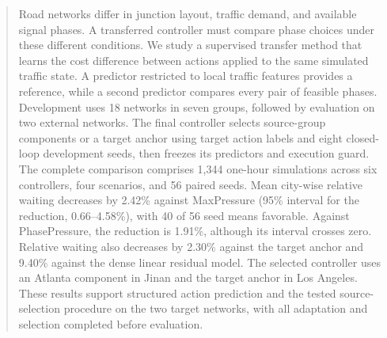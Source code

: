 \begin{abstract}
Road networks differ in junction layout, traffic demand, and available signal phases. A transferred controller must compare phase choices under these different conditions. We study a supervised transfer method that learns the cost difference between actions applied to the same simulated traffic state. A predictor restricted to local traffic features provides a reference, while a second predictor compares every pair of feasible phases. Development uses 18 networks in seven groups, followed by evaluation on two external networks. The final controller selects source-group components or a target anchor using target action labels and eight closed-loop development seeds, then freezes its predictors and execution guard. The complete comparison comprises 1,344 one-hour simulations across six controllers, four scenarios, and 56 paired seeds. Mean city-wise relative waiting decreases by 2.42\% against MaxPressure (95\% interval for the reduction, 0.66--4.58\%), with 40 of 56 seed means favorable. Against PhasePressure, the reduction is 1.91\%, although its interval crosses zero. Relative waiting also decreases by 2.30\% against the target anchor and 9.40\% against the dense linear residual model. The selected controller uses an Atlanta component in Jinan and the target anchor in Los Angeles. These results support structured action prediction and the tested source-selection procedure on the two target networks, with all adaptation and selection completed before evaluation.
\end{abstract}
